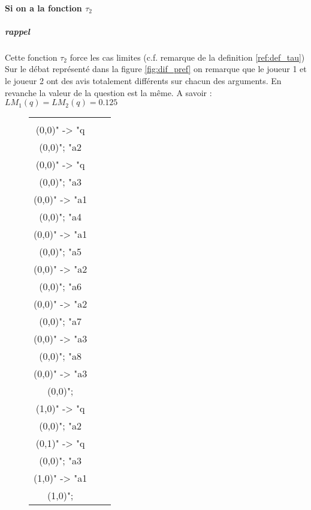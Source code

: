 \documentclass[12pt]{article}
\theoremstyle{defi}
\theoremstyle{not}
\theoremstyle{prob}
\begin{document}
        \paragraph{Si on a la fonction $\tau_2$}

          \subparagraph{rappel} Cette fonction $\tau_2$ force les cas limites (c.f. remarque de la definition \ref{ref:def_tau}) \\

          Sur le débat représenté dans la figure \ref{fig:dif_pref} on remarque que le joueur 1 et le joueur 2 ont des avis totalement différents sur chacun des arguments. En revanche la valeur de la question est la même. A savoir : $LM_1(q) = LM_2(q) = 0.125$

          \begin{figure}
            \centering
            \begin{tabular}{ccc}
              \begin{tikzpicture}[>=stealth]
              \graph [ layered layout, nodes = {scale=0.75, align=center} ] {
              "a1\\ (0,0)" -> "q\\ (0,0)";
              "a2\\ (0,0)" -> "q\\ (0,0)";
              "a3\\ (0,0)" -> "a1\\ (0,0)";
              "a4\\ (0,0)" -> "a1\\ (0,0)";
              "a5\\ (0,0)" -> "a2\\ (0,0)";
              "a6\\ (0,0)" -> "a2\\ (0,0)";
              "a7\\ (0,0)" -> "a3\\ (0,0)";
              "a8\\ (0,0)" -> "a3\\ (0,0)";
              };
              \end{tikzpicture} &
              \begin{tikzpicture}[>=stealth]
              \graph [ layered layout, nodes = {scale=0.75, align=center} ] {
              "a1\\ (1,0)" -> "q\\ (0,0)";
              "a2\\ (0,1)" -> "q\\ (0,0)";
              "a3\\ (1,0)" -> "a1\\ (1,0)";
}
\end{tikzpicture}
\end{tabular}
\end{figure}
\end{document}
